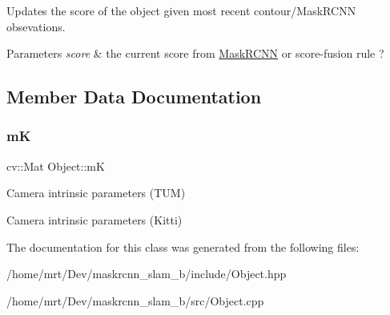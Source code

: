Updates the score of the object given most recent contour/\+Mask\+R\+C\+NN obsevations. 
\begin{DoxyParams}{Parameters}
{\em score} & the current score from \hyperlink{classMaskRCNN}{Mask\+R\+C\+NN} or score-\/fusion rule ? \\
\hline
\end{DoxyParams}


\subsection{Member Data Documentation}
\mbox{\label{classObject_a9cd6392d2ccce339a115090f02275e12}} 
\subsubsection{\texorpdfstring{mK}{mK}}
{\footnotesize\ttfamily cv\+::\+Mat Object\+::mK\hspace{0.3cm}{\ttfamily [protected]}}



Camera intrinsic parameters (T\+UM) 

Camera intrinsic parameters (Kitti) 

The documentation for this class was generated from the following files\+:\begin{DoxyCompactItemize}
\item 
/home/mrt/\+Dev/maskrcnn\+\_\+slam\+\_\+b/include/Object.\+hpp\item 
/home/mrt/\+Dev/maskrcnn\+\_\+slam\+\_\+b/src/Object.\+cpp\end{DoxyCompactItemize}
